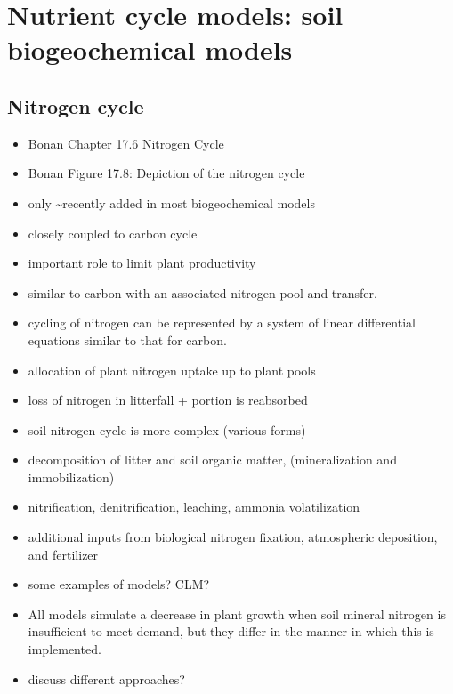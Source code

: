 \documentclass[
  oneside]{book}
\begin{document}
\hypertarget{nutrient-cycle-models-soil-biogeochemical-models}{%
\section{Nutrient cycle models: soil biogeochemical models}\label{nutrient-cycle-models-soil-biogeochemical-models}}

\hypertarget{nitrogen-cycle}{%
\subsection{Nitrogen cycle}\label{nitrogen-cycle}}

\begin{itemize}
\item
  Bonan Chapter 17.6 Nitrogen Cycle
\item
  Bonan Figure 17.8: Depiction of the nitrogen cycle
\item
  only \textasciitilde recently added in most biogeochemical models
\item
  closely coupled to carbon cycle
\item
  important role to limit plant productivity
\item
  similar to carbon with an associated nitrogen pool and transfer.
\item
  cycling of nitrogen can be represented by a system of linear differential equations similar to that for carbon.
\item
  allocation of plant nitrogen uptake up to plant pools
\item
  loss of nitrogen in litterfall + portion is reabsorbed
\item
  soil nitrogen cycle is more complex (various forms)
\item
  decomposition of litter and soil organic matter, (mineralization and immobilization)
\item
  nitrification, denitrification, leaching, ammonia volatilization
\item
  additional inputs from biological nitrogen fixation, atmospheric deposition, and fertilizer
\item
  some examples of models? CLM?
\item
  All models simulate a decrease in plant growth when soil mineral nitrogen is insufficient to meet demand, but they differ in the manner in which this is implemented.
\item
  discuss different approaches?
\end{itemize}
\end{document}
